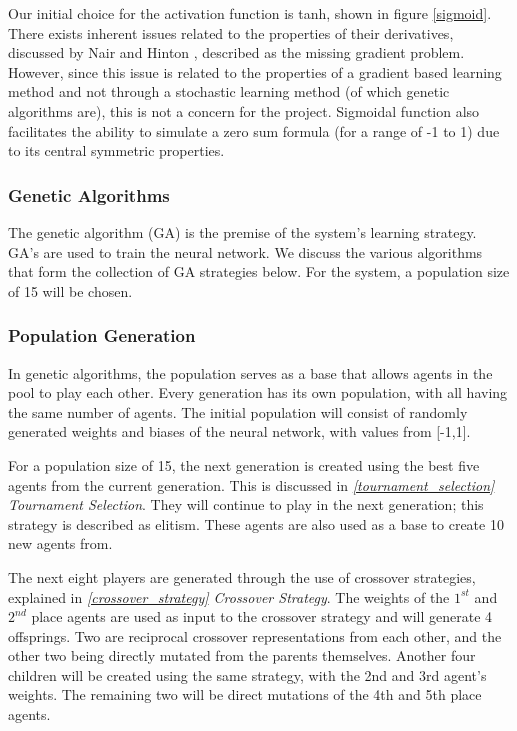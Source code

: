 \documentclass[12pt,a4paper]{article}
\begin{document}
    Our initial choice for the activation function is tanh, shown in figure \ref{sigmoid}. There exists inherent issues related to the properties of their derivatives, discussed by Nair and Hinton \cite{nair_rectified_2010}, described as the missing gradient problem. However, since this issue is related to the properties of a gradient based learning method and not through a stochastic learning method (of which genetic algorithms are), this is not a concern for the project. Sigmoidal function also facilitates the ability to simulate a zero sum formula (for a range of -1 to 1) due to its central symmetric properties.

\subsubsection{Genetic Algorithms} \label{genetic_algorithms}

    The genetic algorithm (GA) is the premise of the system's learning strategy. GA's are used to train the neural network. We discuss the various algorithms that form the collection of GA strategies below. For the system, a population size of 15 will be chosen.

\subsubsection{Population Generation} \label{population_generation}
    In genetic algorithms, the population serves as a base that allows agents in the pool to play each other. Every generation has its own population, with all having the same number of agents. The initial population will consist of randomly generated weights and biases of the neural network, with values from [-1,1]. 
    
    For a population size of 15, the next generation is created using the best five agents from the current generation. This is discussed in {\it{\ref{tournament_selection} Tournament Selection}}. 
    They will continue to play in the next generation; this strategy is described as elitism. These agents are also used as a base to create 10 new agents from. 
    
    The next eight players are generated through the use of crossover strategies, explained in {\it{\ref{crossover_strategy} Crossover Strategy}}. The weights of the $1^{st}$ and $2^{nd}$ place agents are used as input to the crossover strategy and will generate 4 offsprings. Two are reciprocal crossover representations from each other, and the other two being directly mutated from the parents themselves. Another four children will be created using the same strategy, with the 2nd and 3rd agent's weights. The remaining two will be direct mutations of the 4th and 5th place agents.
\end{document}

